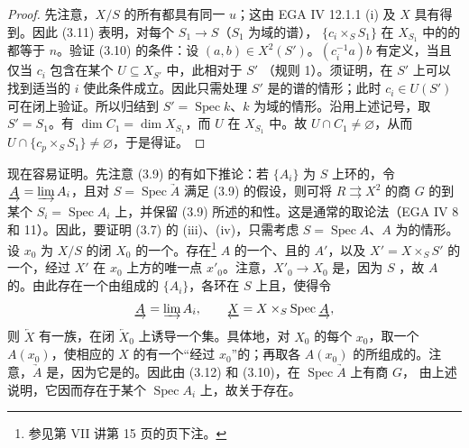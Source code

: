 \begin{proof}
先注意，$X/S$ 的所有都具有同一 $u$；这由 EGA IV 12.1.1 (i) 及 $X$ 具有得到。因此 (3.11) 表明，对每个 $S_1\to S$（$S_1$ 为域的谱）， $\{c_i\times_S S_1\}$ 在 $X_{S_1}$ 中的的都等于 $n$。验证 (3.10) 的条件：设 $(a,b)\in X^2(S')$。$(c_i^{-1}a)b$ 有定义，当且仅当 $c_i$ 包含在某个 $U\subseteq X_{S'}$ 中，此相对于 $S'$ （规则 1）。须证明，在 $S'$ 上可以找到适当的 $i$ 使此条件成立。因此只需处理 $S'$ 是的谱的情形；此时 $c_i\in U(S')$ 可在闭上验证。所以归结到 $S'=\operatorname{Spec}k$、$k$ 为域的情形。沿用上述记号，取 $S'=S_1$。有 $\dim C_1=\dim X_{S_1}$，而 $U$ 在 $X_{S_1}$ 中。故 $U\cap C_1\neq\varnothing$，从而 $U\cap\{c_p\times_S S_1\}\neq\varnothing$，于是得证。
\end{proof}
现在容易证明。先注意 (3.9) 的有如下推论：若 $\{A_i\}$ 为 $S$ 上环的，令 $\underrightarrow A=\varinjlim A_i$，且对 $S=\operatorname{Spec}\underrightarrow A$ 满足 (3.9) 的假设，则可将 $R\rightrightarrows X^2$ 的商 $G$ 的到某个 $S_i=\operatorname{Spec}A_i$ 上，并保留 (3.9) 所述的和性。这是通常的取论法（EGA IV 8 和 11）。因此，要证明 (3.7) 的 (iii)、(iv)，只需考虑 $S=\operatorname{Spec}A$、$A$ 为的情形。设 $x_0$ 为 $X/S$ 的闭 $X_0$ 的一个。存在\footnote{参见第 VII 讲第 15 页的页下注。} $A$ 的一个、且的 $A'$，以及 $X'=X\times_S S'$ 的一个，经过 $X'$ 在 $x_0$ 上方的唯一点 $x'_0$。注意，$X'_0\to X_0$ 是，因为 $S$ ，故 $A$ 的。由此存在一个由组成的 $\{A_i\}$，各环在 $S$ 上且，使得令
\[
\underrightarrow A=\varinjlim A_i,\qquad \underleftarrow X=X\times_S\operatorname{Spec}\underrightarrow A,
\]
则 $\underleftarrow X$ 有一族，在闭 $\underleftarrow X_0$ 上诱导一个集。具体地，对 $X_0$ 的每个 $x_0$，取一个 $A(x_0)$，使相应的 $X$ 的有一个“经过 $x_0$”的；再取各 $A(x_0)$ 的所组成的。注意，$\underrightarrow A$ 是，因为它是的。因此由 (3.12) 和 (3.10)，在 $\operatorname{Spec}\underrightarrow A$ 上有商 $G$，
由上述说明，它因而存在于某个 $\operatorname{Spec}A_i$ 上，故关于存在。

